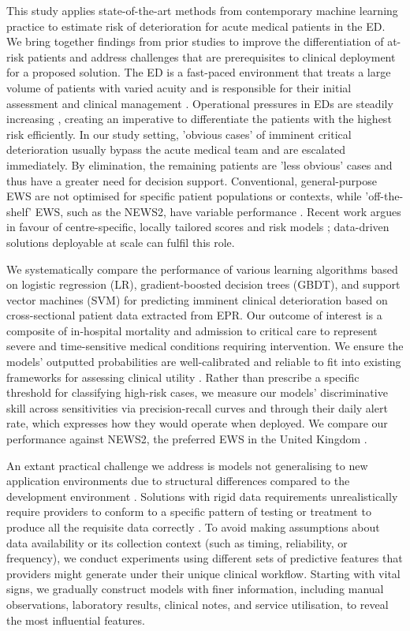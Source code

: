 \documentclass[fleqn,10pt]{wlscirep}
\begin{document}
This study applies state-of-the-art methods from contemporary machine learning practice to estimate risk of deterioration for acute medical patients in the ED. We bring together findings from prior studies to improve the differentiation of at-risk patients and address challenges that are prerequisites to clinical deployment for a proposed solution. The ED is a fast-paced environment that treats a large volume of patients with varied acuity and is responsible for their initial assessment and clinical management \cite{Mohr20}. Operational pressures in EDs are steadily increasing \cite{Ams21}, creating an imperative to differentiate the patients with the highest risk efficiently. In our study setting, 'obvious cases' of imminent critical deterioration usually bypass the acute medical team and are escalated immediately. By elimination, the remaining patients are 'less obvious' cases and thus have a greater need for decision support. Conventional, general-purpose EWS are not optimised for specific patient populations or contexts, while 'off-the-shelf' EWS, such as the NEWS2, have variable performance \cite{Alam14}. Recent work argues in favour of centre-specific, locally tailored scores and risk models \cite{Obrien20, Futoma20}; data-driven solutions deployable at scale can fulfil this role.

We systematically compare the performance of various learning algorithms based on logistic regression (LR), gradient-boosted decision trees (GBDT), and support vector machines (SVM) for predicting imminent clinical deterioration based on cross-sectional patient data extracted from EPR. Our outcome of interest is a composite of in-hospital mortality and admission to critical care to represent severe and time-sensitive medical conditions requiring intervention. We ensure the models’ outputted probabilities are well-calibrated and reliable to fit into existing frameworks for assessing clinical utility \cite{Calster18}. Rather than prescribe a specific threshold for classifying high-risk cases, we measure our models’ discriminative skill across sensitivities via precision-recall curves and through their daily alert rate, which expresses how they would operate when deployed. We compare our performance against NEWS2, the preferred EWS in the United Kingdom \cite{Williams22}.

An extant practical challenge we address is models not generalising to new application environments due to structural differences compared to the development environment \cite{Taylor16, Challen19}. Solutions with rigid data requirements unrealistically require providers to conform to a specific pattern of testing or treatment to produce all the requisite data correctly \cite{Taylor16}. To avoid making assumptions about data availability or its collection context (such as timing, reliability, or frequency), we conduct experiments using different sets of predictive features that providers might generate under their unique clinical workflow. Starting with vital signs, we gradually construct models with finer information, including manual observations, laboratory results, clinical notes, and service utilisation, to reveal the most influential features.
\end{document}
